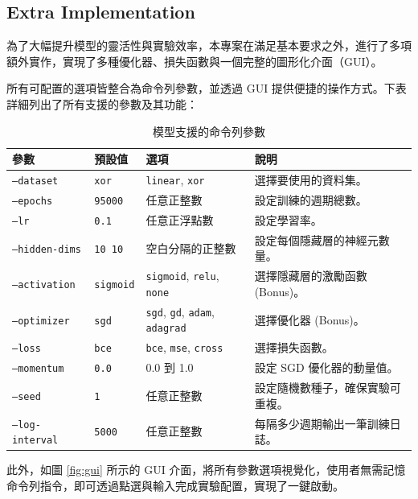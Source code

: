 \documentclass{article}
\begin{document}
\subsection{Extra Implementation}
為了大幅提升模型的靈活性與實驗效率，本專案在滿足基本要求之外，進行了多項額外實作，實現了多種優化器、損失函數與一個完整的圖形化介面（GUI）。

所有可配置的選項皆整合為命令列參數，並透過 GUI 提供便捷的操作方式。下表詳細列出了所有支援的參數及其功能：

\begin{table}[h!]
\centering
\caption{模型支援的命令列參數}
\label{tab:params}
\begin{tabular}{|l|l|l|p{4.5cm}|}
\hline
\textbf{參數} & \textbf{預設值} & \textbf{選項} & \textbf{說明} \\
\hline
\texttt{--dataset} & \texttt{xor} & \texttt{linear}, \texttt{xor} & 選擇要使用的資料集。 \\
\hline
\texttt{--epochs} & \texttt{95000} & 任意正整數 & 設定訓練的週期總數。 \\
\hline
\texttt{--lr} & \texttt{0.1} & 任意正浮點數 & 設定學習率。 \\
\hline
\texttt{--hidden-dims} & \texttt{10 10} & 空白分隔的正整數 & 設定每個隱藏層的神經元數量。 \\
\hline
\texttt{--activation} & \texttt{sigmoid} & \texttt{sigmoid}, \texttt{relu}, \texttt{none} & 選擇隱藏層的激勵函數 (Bonus)。 \\
\hline
\texttt{--optimizer} & \texttt{sgd} & \texttt{sgd}, \texttt{gd}, \texttt{adam}, \texttt{adagrad} & 選擇優化器 (Bonus)。 \\
\hline
\texttt{--loss} & \texttt{bce} & \texttt{bce}, \texttt{mse}, \texttt{cross} & 選擇損失函數。 \\
\hline
\texttt{--momentum} & \texttt{0.0} & 0.0 到 1.0 & 設定 SGD 優化器的動量值。 \\
\hline
\texttt{--seed} & \texttt{1} & 任意正整數 & 設定隨機數種子，確保實驗可重複。 \\
\hline
\texttt{--log-interval} & \texttt{5000} & 任意正整數 & 每隔多少週期輸出一筆訓練日誌。 \\
\hline
\end{tabular}
\end{table}

此外，如圖 \ref{fig:gui} 所示的 GUI 介面，將所有參數選項視覺化，使用者無需記憶命令列指令，即可透過點選與輸入完成實驗配置，實現了一鍵啟動。
\end{document}
